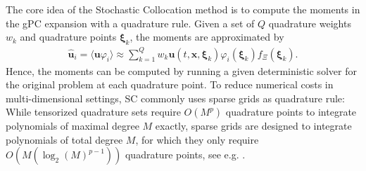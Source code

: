 The core idea of the Stochastic Collocation method is to compute the moments in the gPC expansion with a quadrature rule. Given a set of $Q$ quadrature weights $w_k$ and quadrature points $\bm{\xi}_k$, the moments are approximated by
\begin{align*}
\bm{\hat u}_i = \langle \bm{u}\varphi_i \rangle \approx \sum_{k = 1}^{Q}w_k \bm{u}({t,\bm{x},\bm{\xi}_k})\varphi_i(\bm{\xi}_k)f_{\Xi}(\bm{\xi}_k).
\end{align*} 
Hence, the moments can be computed by running a given deterministic solver for the original problem at each quadrature point. To reduce numerical costs in multi-dimensional settings, SC commonly uses sparse grids as quadrature rule: While tensorized quadrature sets require $O(M^p)$ quadrature points to integrate polynomials of maximal degree $M$ exactly, sparse grids are designed to integrate polynomials of total degree $M$, for which they only require $O(M(\log_2(M)^{p-1}))$ quadrature points, see e.g. \cite{trefethen2017cubature}.

